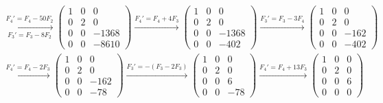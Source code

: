 \begin{ejercicio}
\begin{enumerate}
\begin{multline*}
            \xrightarrow[F_3'=F_3-8F_2]{F_4'=F_4-50F_2}
            \begin{pmatrix}
                1 & 0 & 0 \\
                0 & 2 & 0 \\
                0 & 0 & -1368 \\
                0 & 0 & -8610
            \end{pmatrix}
            \xrightarrow{F_4'=F_4+4F_3}
            \begin{pmatrix}
                1 & 0 & 0 \\
                0 & 2 & 0 \\
                0 & 0 & -1368 \\
                0 & 0 & -402
            \end{pmatrix}
            \xrightarrow{F_3'=F_3-3F_4}
            \begin{pmatrix}
                1 & 0 & 0 \\
                0 & 2 & 0 \\
                0 & 0 & -162 \\
                0 & 0 & -402
            \end{pmatrix}\\
            \xrightarrow{F_4'=F_4-2F_3}
            \begin{pmatrix}
                1 & 0 & 0 \\
                0 & 2 & 0 \\
                0 & 0 & -162 \\
                0 & 0 & -78
            \end{pmatrix}
            \xrightarrow{F_3'=-(F_3-2F_3)}
            \begin{pmatrix}
                1 & 0 & 0 \\
                0 & 2 & 0 \\
                0 & 0 & 6 \\
                0 & 0 & -78
            \end{pmatrix}
            \xrightarrow{F_4'=F_4+13F_3}
            \begin{pmatrix}
                1 & 0 & 0 \\
                0 & 2 & 0 \\
                0 & 0 & 6 \\
                0 & 0 & 0
            \end{pmatrix}
        \end{multline*}
    \end{enumerate}
\end{ejercicio}

